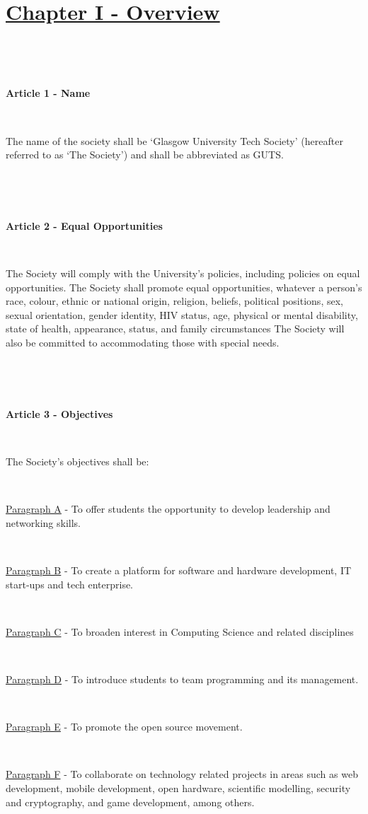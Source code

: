 \section{\underline{Chapter I - Overview}}

~

~

\large{\textbf{Article 1 - Name}}

~

The name of the society shall be `Glasgow University Tech Society'
(hereafter referred to as `The Society') and shall be abbreviated as
GUTS.

~

~

\large{\textbf{Article 2 - Equal Opportunities}}

~

The Society will comply with the University's policies, including
policies on equal opportunities.
The Society shall promote equal opportunities, whatever a person's race, colour, ethnic or national origin, religion, beliefs, political positions, sex, sexual orientation, gender identity, HIV status, age, physical or mental disability, state of health, appearance, status, and family circumstances 
The Society will also be committed to accommodating those with special
needs.

~

~

\large{\textbf{Article 3 - Objectives}}

~

The Society's objectives shall be:

~

\underline{Paragraph A} - To offer students the opportunity to develop
leadership and networking skills.

~

\underline{Paragraph B} - To create a platform for software and hardware
development, IT start-ups and tech enterprise.

~

\underline{Paragraph C} - To broaden interest in Computing Science and
related disciplines

~

\underline{Paragraph D} - To introduce students to team programming and
its management.

~

\underline{Paragraph E} - To promote the open source movement.

~

\underline{Paragraph F} - To collaborate on technology related projects
in areas such as web development, mobile development, open hardware,
scientific modelling, security and cryptography, and game development,
among others.

